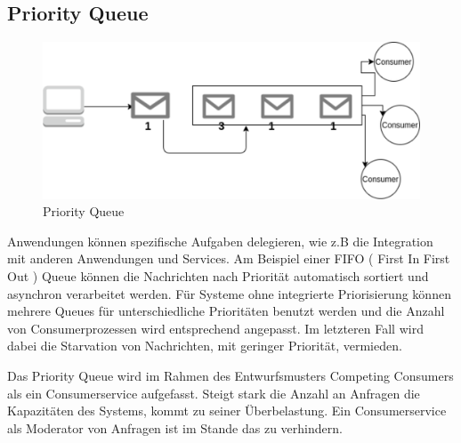 \documentclass[
12pt,
english,
ngerman,
headsepline,
twoside,
openright,
numbers=noenddot,version=first
]{scrreprt}
\begin{document}




\subsection{Priority Queue}\label{sec:priority-queue}
\begin{figure}
	\includegraphics[scale=0.36]{./pics/pattern-priority-queue.eps}
	\caption{Priority Queue}
	\label{pic:priority-queue}
\end{figure}
Anwendungen können spezifische Aufgaben delegieren, wie z.B die Integration mit anderen Anwendungen und Services. Am Beispiel einer FIFO ( First In First Out ) Queue können die Nachrichten nach Priorität automatisch sortiert und asynchron verarbeitet werden. Für Systeme ohne integrierte Priorisierung können mehrere Queues für unterschiedliche Prioritäten benutzt werden und die Anzahl von Consumerprozessen wird entsprechend angepasst. Im letzteren Fall wird dabei die Starvation von Nachrichten, mit geringer Priorität, vermieden.

Das Priority Queue wird im Rahmen des Entwurfsmusters Competing Consumers als ein Consumerservice aufgefasst. Steigt stark die Anzahl an Anfragen die Kapazitäten des Systems, kommt zu seiner Überbelastung. Ein Consumerservice als Moderator von Anfragen ist im Stande das zu verhindern.
\end{document}
